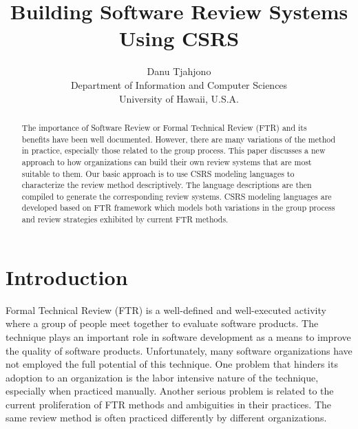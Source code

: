 


\title {Building Software Review Systems\\
 Using CSRS}
\author{ Danu Tjahjono\\
Department of Information and Computer Sciences \\
University of Hawaii, U.S.A.}

\maketitle

\thispagestyle{empty}
\begin{abstract}
The importance of Software Review or Formal Technical Review (FTR) and
its benefits have been well documented. However, there are many
variations of the method in practice, especially those related to the
group process.  This paper discusses a new approach to how
organizations can build their own review systems that are most
suitable to them.  Our basic approach is to use CSRS modeling
languages to characterize the review method descriptively.  The
language descriptions are then compiled to generate the corresponding
review systems.  CSRS modeling languages are developed based on FTR
framework which models both variations in the group process
and review strategies exhibited by current FTR methods.


\end{abstract}

\section{Introduction}

Formal Technical Review  (FTR) is a well-defined and well-executed
activity where a group of people meet together to evaluate software
products. The technique plays an important role in software
development as a means to 
improve the quality of software products. Unfortunately, many
software organizations have not employed the full potential of
this technique.  One problem that hinders its adoption to an
organization is the labor intensive nature of the technique,
especially when practiced manually. Another serious problem is related
to  the current proliferation of FTR methods and ambiguities in their 
practices. The same review method is often practiced differently by
different organizations. 

